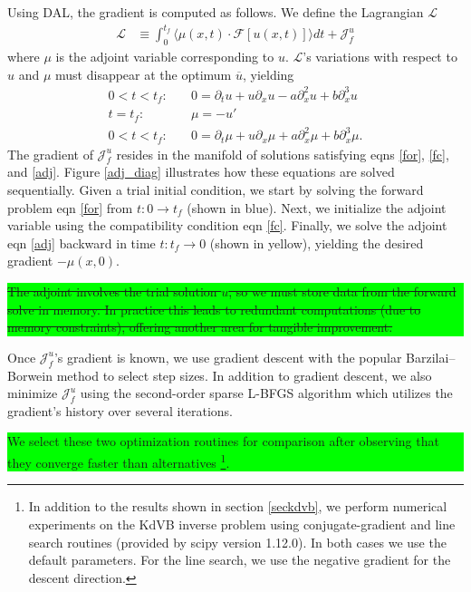 \documentclass[%
 reprint,
 amsmath,amssymb,
 aps,
 pre,
]{revtex4-2}
\newcommand{\hly}[1]{\colorbox{lime}{\parbox{\columnwidth}{#1}}}
\renewcommand\L {\mathcal{L}}
\newcommand{\Juf}{\mathcal{J}^{u}_f}
\begin{document}
Using DAL, the gradient is computed as follows.
We define the Lagrangian $\L$
\begin{align}
  \L &\equiv \int_0^{t_f} \Big\langle \mu(x,t) \cdot \mathcal{F}[u(x,t)] \Big\rangle dt + \Juf
\end{align}
where $\mu$ is the adjoint variable corresponding to $u$.
$\L$'s variations with respect to $u$ and $\mu$ must disappear at the optimum $\overline{u}$, yielding
\begin{align}
  0<t<t_f: \quad  &0 =  \partial_t u + u\partial_x u - a\partial_x^2 u + b\partial_x^3 u \label{for}\\
  t=t_f:  \quad &\mu = -u' \label{fc}\\
  0<t<t_f: \quad &0 = \partial_t\mu + u\partial_x \mu + a\partial_x^2 \mu + b\partial_x^3 \mu \label{adj}.
\end{align}
The gradient of $\Juf$ resides in the manifold of solutions satisfying eqns \ref{for}, \ref{fc}, and \ref{adj}.
Figure \ref{adj_diag} illustrates how these equations are solved sequentially.
Given a trial initial condition, we start by solving the forward problem eqn \ref{for} from $t:0\to t_f$ (shown in blue). 
Next, we initialize the adjoint variable using the compatibility condition eqn \ref{fc}. 
Finally, we solve the adjoint eqn \ref{adj} backward in time $t:t_f\to 0$ (shown in yellow), yielding the desired gradient $-\mu(x,0)$. 
\hly{\st{The adjoint involves the trial solution $u$, so we must store data from the forward solve in memory. 
In practice this leads to redundant computations (due to memory constraints), offering another area for tangible improvement.}}

Once $\Juf$'s gradient is known, we use gradient descent with the popular Barzilai--Borwein method \cite{10.1093/imanum/8.1.141} to select step sizes. 
In addition to gradient descent, we also minimize $\Juf$ using the second-order sparse L-BFGS algorithm \cite{doi:10.1137/0916069} which utilizes the gradient's history over several iterations.
\hly{We select these two optimization routines for comparison after observing that they converge faster than alternatives \footnote[2]{In addition to the results shown in section \ref{seckdvb}, we perform numerical experiments on the KdVB inverse problem using conjugate-gradient and line search routines (provided by scipy version 1.12.0).
In both cases we use the default parameters.
For the line search, we use the negative gradient for the descent direction.}.}
\end{document}
